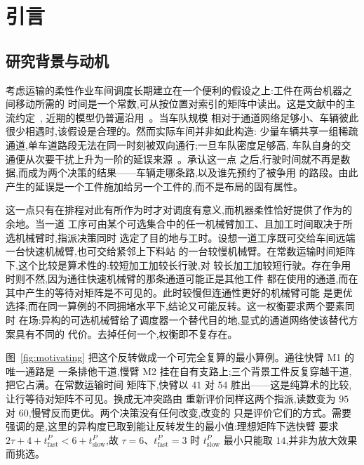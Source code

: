 \documentclass[manuscript,screen,review]{acmart}
\begin{document}
\maketitle
\section{引言}
\label{sec:Chapter_I}

\subsection{研究背景与动机}

考虑运输的柔性作业车间调度长期建立在一个便利的假设之上:工件在两台机器之间移动所需的
时间是一个常数,可从按位置对索引的矩阵中读出。这是文献中的主流约定~\cite{xin2025review},
近期的模型仍普遍沿用~\cite{meng2025cp,qin2026knowledge,fu2025integrated}。当车队规模
相对于通道网络足够小、车辆彼此很少相遇时,该假设是合理的。然而实际车间并非如此构造:
少量车辆共享一组稀疏通道,单车道路段无法在同一时刻被双向通行;一旦车队密度足够高,
车队自身的交通便从次要干扰上升为一阶的延误来源~\cite{kim2026congestion}。承认这一点
之后,行驶时间就不再是数据,而成为两个决策的结果——车辆走哪条路,以及谁先预约了被争用
的路段。由此产生的延误是一个工件施加给另一个工件的,而不是布局的固有属性。

这一点只有在排程对此有所作为时才对调度有意义,而机器柔性恰好提供了作为的余地。当一道
工序可由某个可选集合中的任一机械臂加工、且加工时间取决于所选机械臂时,指派决策同时
选定了目的地与工时。设想一道工序既可交给车间远端一台快速机械臂,也可交给紧邻上下料站
的一台较慢机械臂。在常数运输时间矩阵下,这个比较是算术性的:较短加工加较长行驶,对
较长加工加较短行驶。存在争用时则不然,因为通往快速机械臂的那条通道可能正是其他工件
都在使用的通道,而在其中产生的等待对矩阵是不可见的。此时较慢但连通性更好的机械臂可能
是更优选择;而在同一算例的不同拥堵水平下,结论又可能反转。这一权衡要求两个要素同时
在场:异构的可选机械臂给了调度器一个替代目的地,显式的通道网络使该替代方案具有不同的
代价。去掉任何一个,权衡即不复存在。

图~\ref{fig:motivating} 把这个反转做成一个可完全复算的最小算例。通往快臂 M1 的唯一通路是
一条排他干道,慢臂 M2 挂在自有支路上;三个背景工件反复穿越干道,把它占满。在常数运输时间
矩阵下,快臂以 $41$ 对 $54$ 胜出——这是纯算术的比较,让行等待对矩阵不可见。换成无冲突路由
重新评价同样这两个指派,读数变为 $95$ 对 $60$,慢臂反而更优。两个决策没有任何改变,改变的
只是评价它们的方式。需要强调的是,这里的异构度已取到能让反转发生的最小值:理想矩阵下选快臂
要求 $2\tau+4+t^P_{\text{fast}}<6+t^P_{\text{slow}}$,故 $\tau=6$、$t^P_{\text{fast}}=3$ 时
$t^P_{\text{slow}}$ 最小只能取 $14$,并非为放大效果而挑选。
\end{document}
